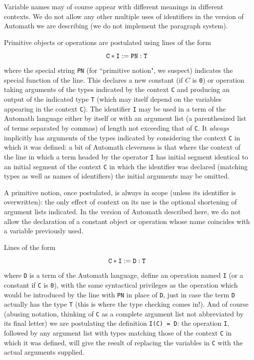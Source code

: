 \documentclass[12pt]{article}
\begin{document}
Variable names may of course appear with different meanings in different contexts.  We do not allow any other multiple uses of identifiers in the version of Automath we are describing (we do not implement the paragraph system).

Primitive objects or operations are postulated using lines of the form

$${\tt C * I := PN : T}$$

where the special string {\tt PN} (for ``primitive notion", we suspect) indicates the special function of the line.   This declares a new constant (if $C$ is {\tt 0}) or operation
taking arguments of the types indicated by the context {\tt C} and producing an output of the indicated type {\tt T} (which may itself depend on the variables appearing in the context {\tt C}).  The identifier {\tt I} may be used in a term of the Automath language either by itself or with an argument list (a parenthesized list of terms separated by commas) of length not exceeding that of {\tt C}.  It {\em always} implicitly has arguments of the types indicated by considering the context {\tt C}
in which it was defined:  a bit of Automath cleverness is that where the context of the line in which a term headed by the operator {\tt I}  has initial segment identical to an initial segment of the context {\tt C} in which
the identifier was declared (matching types as well as names of identifiers) the initial arguments may be omitted.

A primitive notion, once postulated, is always in scope (unless its identifier is overwritten):  the only effect of context on its use is the optional shortening of argument lists indicated.  In the version of Automath described here, we do not allow the declaration of a constant object or operation whose name coincides with a variable previously used.

Lines of the form

$${\tt C * I := D : T}$$

where {\tt D} is a term of the Automath language, define an operation named {\tt I} (or a constant if {\tt C} is {\tt 0}), with the same syntactical privileges as the operation which would be introduced by the line
with {\tt PN} in place of {\tt D}, just in case the term {\tt D} actually has the type {\tt T} (this is where the type checking comes in!).  And of course (abusing notation, thinking
of {\tt C} as a complete argument list not abbreviated by its final letter) we are postulating the definition {\tt I(C) = D}:  the operation {\tt I}, followed by any argument list
with types matching those of the context {\tt C} in which it was defined, will give the result of replacing the variables in {\tt C} with the actual arguments supplied.
\end{document}
